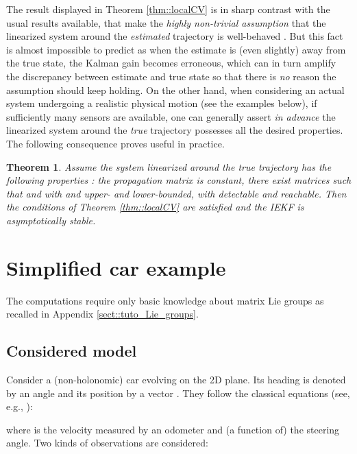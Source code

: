 \documentclass[a4paper,12pt,onecolumn]{article}
\newtheorem{thm}{Theorem}
\begin{document}
The result displayed in Theorem \ref{thm::localCV} is in sharp contrast with the usual results available, that make the \emph{highly non-trivial  assumption} that the linearized system around the \emph{estimated} trajectory is well-behaved \cite{boutayeb,song-grizzle-95,reif,bonnabel2012contraction}. But this fact is almost impossible to predict as when the estimate is (even slightly) away  from the true state, the Kalman gain becomes erroneous, which can in turn amplify the discrepancy between estimate and true state so that there is \emph{no} reason the assumption should keep holding. On the other hand, when considering an actual system undergoing a realistic physical motion (see the examples below), if sufficiently many sensors are available, one can generally assert \emph{in advance} the linearized system around the \emph{true} trajectory  possesses all the desired properties. The following consequence  proves useful in practice.
\begin{thm}
\label{thm::bounded}
Assume the system linearized around the \emph{true} trajectory has the following properties : the propagation matrix  is constant, there exist matrices  such that  and  with  and  upper- and lower-bounded, with  detectable and reachable. Then the conditions of Theorem \ref{thm::localCV} are satisfied and the IEKF is asymptotically stable.
\end{thm}





\section{Simplified car example}\label{sect::examples:A}
The computations require only  basic knowledge about matrix Lie groups as recalled in Appendix \ref{sect::tuto_Lie_groups}.


\subsection{Considered model}



Consider a (non-holonomic) car evolving on the 2D plane. Its heading is denoted by an angle  and its position by a vector . They follow the classical equations (see, e.g., \cite{de1998feedback}):

where  is the velocity measured by an odometer and  (a function of) the steering angle. Two kinds of observations are considered:
\end{document}

